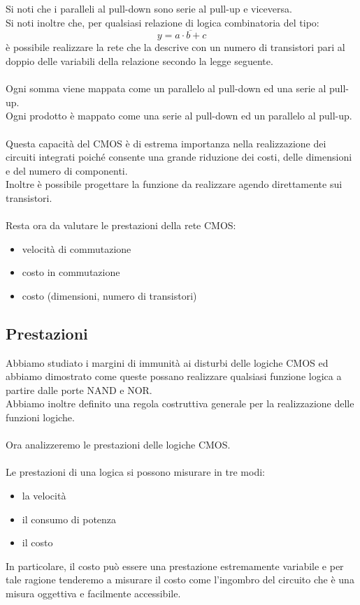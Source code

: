 \documentclass[../main.tex]{subfiles}
\begin{document}
	Si noti che i paralleli al pull-down sono serie al pull-up e viceversa.\\
	Si noti inoltre che, per qualsiasi relazione di logica combinatoria del tipo:
	$$y = \overline{a \cdot b + c}$$
	è possibile realizzare la rete che la descrive con un numero di transistori pari al doppio delle variabili della relazione secondo la legge seguente.\\\\
	Ogni somma viene mappata come un parallelo al pull-down ed una serie al pull-up.\\
	Ogni prodotto è mappato come una serie al pull-down ed un parallelo al pull-up.\\\\
	Questa capacità del CMOS è di estrema importanza nella realizzazione dei circuiti integrati poiché consente una grande riduzione dei costi, delle dimensioni e del numero di componenti.\\
	Inoltre è possibile progettare la funzione da realizzare agendo direttamente sui transistori.\\\\
	Resta ora da valutare le prestazioni della rete CMOS:
	\begin{itemize}
		\item velocità di commutazione
		\item costo in commutazione
		\item costo (dimensioni, numero di transistori)
	\end{itemize}
	\subsection{Prestazioni}
	Abbiamo studiato i margini di immunità ai disturbi delle logiche CMOS ed abbiamo dimostrato come queste possano realizzare qualsiasi funzione logica a partire dalle porte NAND e NOR.\\
	Abbiamo inoltre definito una regola costruttiva generale per la realizzazione delle funzioni logiche.\\\\
	Ora analizzeremo le prestazioni delle logiche CMOS.\\\\
	Le prestazioni di una logica si possono misurare in tre modi:
	\begin{itemize}
		\item la velocità
		\item il consumo di potenza
		\item il costo
	\end{itemize}
	In particolare, il costo può essere una prestazione estremamente variabile e per tale ragione tenderemo a misurare il costo come l'ingombro del circuito che è una misura oggettiva e facilmente accessibile.
\end{document}
